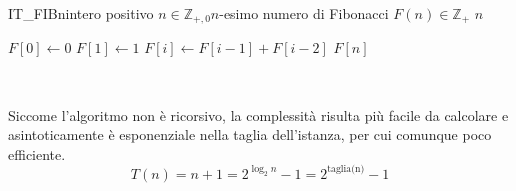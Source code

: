 \begin{algo}{IT\_FIB}{n}{intero positivo $n \in \mathbb{Z}_{+,0}$}{$n$-esimo numero di Fibonacci $F(n) \in \mathbb{Z}_{+}$}
		\State \Return \(n\)
	\EndIf

	\State
	\State \(F[0] \gets 0\)
	\State \(F[1] \gets 1\)
		\State \(F[i] \gets F[i-1] + F[i-2]\)
	\EndFor
	\State \Return \(F[n]\)
\end{algo}

~

\noindent
Siccome l'algoritmo non è ricorsivo, la complessità risulta più facile da calcolare e asintoticamente è esponenziale nella
taglia dell'istanza, per cui comunque poco efficiente.
\[T(n) = n + 1 = 2^{\log_2 n} - 1 = 2^\text{taglia(n)} - 1\]


